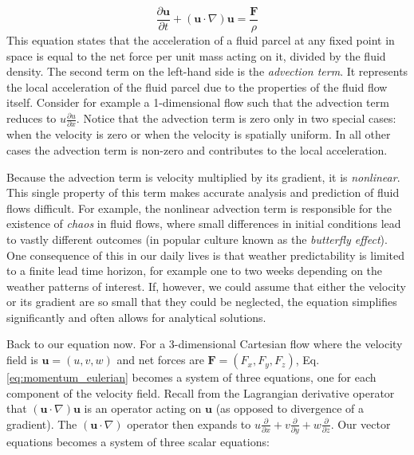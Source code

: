 \documentclass[12pt]{article}
\numberwithin{equation}{section}
\numberwithin{figure}{section}
\numberwithin{table}{section}
\begin{document}
\begin{equation}
  \frac{\partial \mathbf{u}}{\partial t} + (\mathbf{u} \cdot \nabla) \mathbf{u} = \frac{\mathbf{F}}{\rho}
  \label{eq:momentum_eulerian}
\end{equation}
This equation states that the acceleration of a fluid parcel at any fixed point
in space is equal to the net force per unit mass acting on it, divided by the
fluid density.
The second term on the left-hand side is the \textit{advection term}.
It represents the local acceleration of the fluid parcel due to the properties
of the fluid flow itself.
Consider for example a 1-dimensional flow such that the advection term reduces
to $u \frac{\partial u}{\partial x}$.
Notice that the advection term is zero only in two special cases:
when the velocity is zero or when the velocity is spatially uniform.
In all other cases the advection term is non-zero and contributes to the local
acceleration.

Because the advection term is velocity multiplied by its gradient, it is
\textit{nonlinear}.
This single property of this term makes accurate analysis and prediction of
fluid flows difficult.
For example, the nonlinear advection term is responsible for the existence of
\textit{chaos} in fluid flows, where small differences in initial
conditions lead to vastly different outcomes (in popular culture known as the
\textit{butterfly effect}).
One consequence of this in our daily lives is that weather predictability
is limited to a finite lead time horizon, for example one to two weeks depending
on the weather patterns of interest.
If, however, we could assume that either the velocity or its gradient are so
small that they could be neglected, the equation simplifies significantly
and often allows for analytical solutions.

Back to our equation now.
For a 3-dimensional Cartesian flow where the velocity field is $\mathbf{u} = (u, v, w)$
and net forces are $\mathbf{F} = (F_x, F_y, F_z)$, Eq. \ref{eq:momentum_eulerian}
becomes a system of three equations, one for each component of the velocity field.
Recall from the Lagrangian derivative operator that $(\mathbf{u} \cdot \nabla) \mathbf{u}$
is an operator acting on $\mathbf{u}$ (as opposed to divergence of a gradient).
The $(\mathbf{u} \cdot \nabla)$ operator then expands to
$u\frac{\partial}{\partial x} + v\frac{\partial}{\partial y} + w\frac{\partial}{\partial z}$.
Our vector equations becomes a system of three scalar equations:
\end{document}
